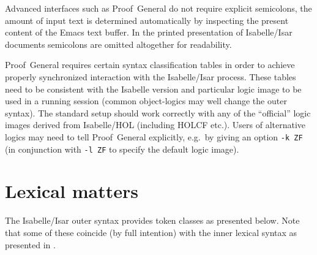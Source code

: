 Advanced interfaces such as Proof~General \cite{proofgeneral} do not require
explicit semicolons, the amount of input text is determined automatically by
inspecting the present content of the Emacs text buffer.  In the printed
presentation of Isabelle/Isar documents semicolons are omitted altogether for
readability.

\begin{warn}
  Proof~General requires certain syntax classification tables in order to
  achieve properly synchronized interaction with the Isabelle/Isar process.
  These tables need to be consistent with the Isabelle version and particular
  logic image to be used in a running session (common object-logics may well
  change the outer syntax).  The standard setup should work correctly with any
  of the ``official'' logic images derived from Isabelle/HOL (including HOLCF
  etc.).  Users of alternative logics may need to tell Proof~General
  explicitly, e.g.\ by giving an option \verb,-k ZF, (in conjunction with
  \verb,-l ZF, to specify the default logic image).
\end{warn}

\section{Lexical matters}\label{sec:lex-syntax}

The Isabelle/Isar outer syntax provides token classes as presented below.
Note that some of these coincide (by full intention) with the inner lexical
syntax as presented in \cite{isabelle-ref}.

